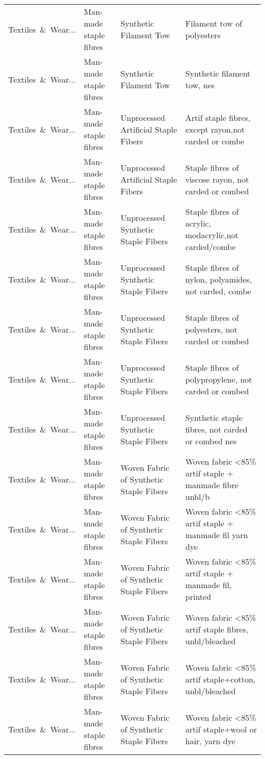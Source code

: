 \begin{appendices}
\begin{xltabular}{\textwidth}{|p{0.10\textwidth}|p{0.25\textwidth}|p{0.24\textwidth}|p{0.31\textwidth}|}
Textiles\ \&\ Wear... & Man-made staple fibres & Synthetic Filament Tow & Filament tow of polyesters \\
Textiles\ \&\ Wear... & Man-made staple fibres & Synthetic Filament Tow & Synthetic filament tow, nes \\
Textiles\ \&\ Wear... & Man-made staple fibres & Unprocessed Artificial Staple Fibers & Artif staple fibres, except rayon,not carded or combe \\
Textiles\ \&\ Wear... & Man-made staple fibres & Unprocessed Artificial Staple Fibers & Staple fibres of viscose rayon, not carded or combed \\
Textiles\ \&\ Wear... & Man-made staple fibres & Unprocessed Synthetic Staple Fibers & Staple fibres of acrylic, modacrylic,not carded/combe \\
Textiles\ \&\ Wear... & Man-made staple fibres & Unprocessed Synthetic Staple Fibers & Staple fibres of nylon, polyamides, not carded, combe \\
Textiles\ \&\ Wear... & Man-made staple fibres & Unprocessed Synthetic Staple Fibers & Staple fibres of polyesters, not carded or combed \\
Textiles\ \&\ Wear... & Man-made staple fibres & Unprocessed Synthetic Staple Fibers & Staple fibres of polypropylene, not carded or combed \\
Textiles\ \&\ Wear... & Man-made staple fibres & Unprocessed Synthetic Staple Fibers & Synthetic staple fibres, not carded or combed nes \\
Textiles\ \&\ Wear... & Man-made staple fibres & Woven Fabric of Synthetic Staple Fibers & Woven fabric <85\% artif staple + manmade fibre unbl/b \\
Textiles\ \&\ Wear... & Man-made staple fibres & Woven Fabric of Synthetic Staple Fibers & Woven fabric <85\% artif staple + manmade fil yarn dye \\
Textiles\ \&\ Wear... & Man-made staple fibres & Woven Fabric of Synthetic Staple Fibers & Woven fabric <85\% artif staple + manmade fil, printed \\
Textiles\ \&\ Wear... & Man-made staple fibres & Woven Fabric of Synthetic Staple Fibers & Woven fabric <85\% artif staple fibres, unbl/bleached \\
Textiles\ \&\ Wear... & Man-made staple fibres & Woven Fabric of Synthetic Staple Fibers & Woven fabric <85\% artif staple+cotton, unbl/bleached \\
Textiles\ \&\ Wear... & Man-made staple fibres & Woven Fabric of Synthetic Staple Fibers & Woven fabric <85\% artif staple+wool or hair, yarn dye \\

\end{xltabular}
\end{appendices}
